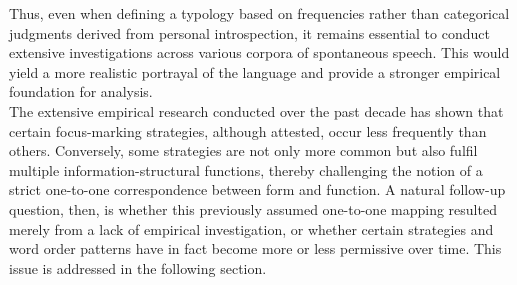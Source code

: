 Thus, even when defining a typology based on frequencies rather than categorical judgments derived from personal introspection, it remains essential to conduct extensive investigations across various corpora of spontaneous speech. This would yield a more realistic portrayal of the language and provide a stronger empirical foundation for analysis.\\
The extensive empirical research conducted over the past decade has shown that certain focus-marking strategies, although attested, occur less frequently than others. Conversely, some strategies are not only more common but also fulfil multiple information-structural functions, thereby challenging the notion of a strict one-to-one correspondence between form and function. A natural follow-up question, then, is whether this previously assumed one-to-one mapping resulted merely from a lack of empirical investigation, or whether certain strategies and word order patterns have in fact become more or less permissive over time. This issue is addressed in the following section.

